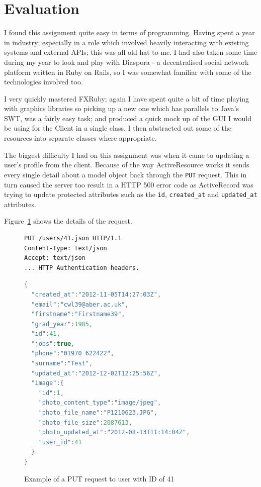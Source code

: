 \documentclass{article}
\begin{document}
\section{Evaluation}
I found this assignment quite easy in terms of programming. Having spent a year in 
industry; especially in a role which involved heavily interacting with existing systems
and external APIs; this was all old hat to me. I had also taken some time during my year
to look and play with Diaspora - a decentralised social network platform written in Ruby
on Rails, so I was somewhat familiar with some of the technologies involved too.

I very quickly mastered FXRuby; again I have spent quite a bit of time playing with 
graphics libraries so picking up a new one which has parallels to Java's SWT, was a 
fairly easy task; and produced a quick mock up of the GUI I would be using for the Client
in a single class. I then abstracted out some of the resources into separate classes 
where appropriate.

The biggest difficulty I had on this assignment was when it came to updating a user's
profile from the client. Because of the way ActiveResource works it sends every single 
detail about a model object back through the \verb$PUT$ request. This in turn caused the
server too result in a HTTP 500 error code as ActiveRecord was trying to update protected
attributes such as the \verb$id$, \verb$created_at$ and \verb$updated_at$ attributes.

Figure~\ref{fig:activeresource-to-activerrecord-500} shows the details of the request.

\begin{figure}[h]
\begin{verbatim}
PUT /users/41.json HTTP/1.1
Content-Type: text/json
Accept: text/json
... HTTP Authentication headers.
\end{verbatim}
\begin{lstlisting}[language=java]
{
  "created_at":"2012-11-05T14:27:03Z",
  "email":"cwl39@aber.ac.uk",
  "firstname":"Firstname39",
  "grad_year":1985,
  "id":41,
  "jobs":true,
  "phone":"01970 622422",
  "surname":"Test",
  "updated_at":"2012-12-02T12:25:56Z",
  "image":{
    "id":1,
    "photo_content_type":"image/jpeg",
    "photo_file_name":"P1210623.JPG",
    "photo_file_size":2087613,
    "photo_updated_at":"2012-08-13T11:14:04Z",
    "user_id":41
  }
}
\end{lstlisting}
\caption{Example of a PUT request to user with ID of 41}
\label{fig:activeresource-to-activerrecord-500}
\end{figure}
\end{document}
